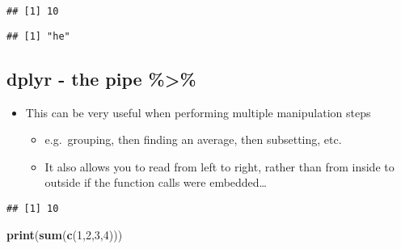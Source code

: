 \documentclass[]{article}
\newenvironment{Shaded}{\begin{snugshade}}{\end{snugshade}}
\newcommand{\KeywordTok}[1]{\textcolor[rgb]{0.13,0.29,0.53}{\textbf{#1}}}
\newcommand{\DecValTok}[1]{\textcolor[rgb]{0.00,0.00,0.81}{#1}}
\newcommand{\StringTok}[1]{\textcolor[rgb]{0.31,0.60,0.02}{#1}}
\newcommand{\OperatorTok}[1]{\textcolor[rgb]{0.81,0.36,0.00}{\textbf{#1}}}
\newcommand{\NormalTok}[1]{#1}
\providecommand{\tightlist}{%
  \setlength{\itemsep}{0pt}\setlength{\parskip}{0pt}}
\begin{document}
\begin{verbatim}
## [1] 10
\end{verbatim}

\begin{Shaded}
\end{Shaded}

\begin{verbatim}
## [1] "he"
\end{verbatim}

\subsection{dplyr - the pipe
\%\textgreater{}\%}\label{dplyr---the-pipe-1}

\begin{itemize}
\tightlist
\item
  This can be very useful when performing multiple manipulation steps

  \begin{itemize}
  \tightlist
  \item
    e.g.~grouping, then finding an average, then subsetting, etc.
  \item
    It also allows you to read from left to right, rather than from
    inside to outside if the function calls were embedded\ldots{}
  \end{itemize}
\end{itemize}

\begin{Shaded}
\end{Shaded}

\begin{verbatim}
## [1] 10
\end{verbatim}

\begin{Shaded}
\begin{Highlighting}[]
\KeywordTok{print}\NormalTok{(}\KeywordTok{sum}\NormalTok{(}\KeywordTok{c}\NormalTok{(}\DecValTok{1}\NormalTok{,}\DecValTok{2}\NormalTok{,}\DecValTok{3}\NormalTok{,}\DecValTok{4}\NormalTok{)))}
\end{Highlighting}
\end{Shaded}
\end{document}
